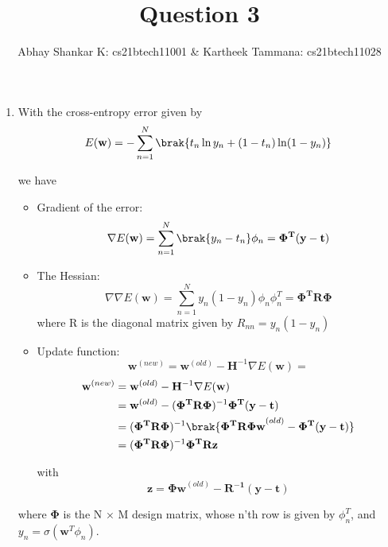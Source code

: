 \documentclass{amsart}
\begin{document}
    \title{Question 3}
    \author{Abhay Shankar K: cs21btech11001 \& Kartheek Tammana: cs21btech11028}
    \maketitle

    \begin{enumerate}[label=\textbf{(\Roman*)}]
        \item With the cross-entropy error given by \begin{equation}
            E(\mathbf{w}) = - \sum_{n = 1}^{N} \brak{t_n \ln y_n + (1 - t_n) \ln (1 - y_n)}
        \end{equation}

        we have
        \begin{itemize}
            \item Gradient of the error: \[\nabla E(\mathbf{w}) = \sum_{n = 1}^{N} \brak{y_n - t_n} \phi_n = \mathbf{\Phi^T(y - t)}\]
            \item The Hessian: \[\nabla \nabla E(\mathbf{w}) = \sum_{n = 1}^{N} y_n (1 - y_n) \phi_n \phi_n^T = \mathbf{\Phi^T R \Phi}\] where R is the diagonal matrix given by \(R_{nn} = y_n (1 - y_n)\)
            \item Update function: \[\mathbf{w}^{(new)} = \mathbf{w}^{(old)} - \mathbf{H}^{-1} \nabla E(\mathbf{w}) = \]
            \begin{align}
                \begin{split}
                    \mathbf{w}^{(new)} &= \mathbf{w}^{(old)} - \mathbf{H}^{-1} \nabla E(\mathbf{w}) \\
                            &= \mathbf{w}^{(old)} - (\mathbf{\Phi^T R \Phi})^{-1} \mathbf{\Phi^T(y - t)} \\
                            &= (\mathbf{\Phi^T R \Phi})^{-1} \brak{\mathbf{\Phi^T R \Phi w}^{(old)} - \mathbf{\Phi^T(y - t)}} \\
                            &= (\mathbf{\Phi^T R \Phi})^{-1} \mathbf{\Phi^T R z} \label{eq:update}
                \end{split}
            \end{align}

            with \[\mathbf{z} = \mathbf{\Phi w}^{(old)} - \mathbf{R^{-1} (y - t)}\]
        \end{itemize}

        where \(\mathbf{\Phi}\) is the N × M design matrix, whose n'th row is given by \(\phi_n^T\), and \(y_n = \sigma(\mathbf{w}^T \phi_n)\).


\end{enumerate}
\end{document}
